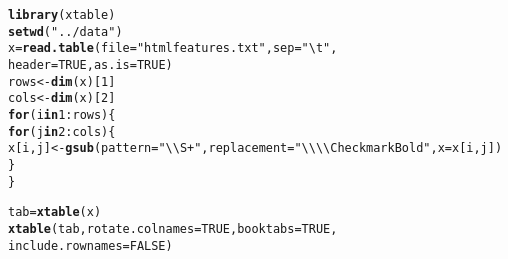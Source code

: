 \documentclass{article}\usepackage[]{graphicx}\usepackage[]{color}
\makeatletter
\newcommand{\hlnum}[1]{\textcolor[rgb]{0.686,0.059,0.569}{#1}}%
\newcommand{\hlstr}[1]{\textcolor[rgb]{0.192,0.494,0.8}{#1}}%
\newcommand{\hlopt}[1]{\textcolor[rgb]{0,0,0}{#1}}%
\newcommand{\hlstd}[1]{\textcolor[rgb]{0.345,0.345,0.345}{#1}}%
\newcommand{\hlkwa}[1]{\textcolor[rgb]{0.161,0.373,0.58}{\textbf{#1}}}%
\newcommand{\hlkwb}[1]{\textcolor[rgb]{0.69,0.353,0.396}{#1}}%
\newcommand{\hlkwc}[1]{\textcolor[rgb]{0.333,0.667,0.333}{#1}}%
\newcommand{\hlkwd}[1]{\textcolor[rgb]{0.737,0.353,0.396}{\textbf{#1}}}%
\newenvironment{kframe}{%
 \def\at@end@of@kframe{}%
 \ifinner\ifhmode%
  \def\at@end@of@kframe{\end{minipage}}%
  \begin{minipage}{\columnwidth}%
 \fi\fi%
 \def\FrameCommand##1{\hskip\@totalleftmargin \hskip-\fboxsep
 \colorbox{shadecolor}{##1}\hskip-\fboxsep
     \hskip-\linewidth \hskip-\@totalleftmargin \hskip\columnwidth}%
 \MakeFramed {\advance\hsize-\width
   \@totalleftmargin\z@ \linewidth\hsize
   \@setminipage}}%
 {\par\unskip\endMakeFramed%
 \at@end@of@kframe}
\makeatother
\begin{document}
\begin{kframe}
\begin{alltt}
\hlkwd{library}\hlstd{(xtable)}
\hlkwd{setwd}\hlstd{(}\hlstr{"../data"}\hlstd{)}
\hlstd{x} \hlkwb{=} \hlkwd{read.table}\hlstd{(}\hlkwc{file} \hlstd{=} \hlstr{"htmlfeatures.txt"}\hlstd{,} \hlkwc{sep} \hlstd{=} \hlstr{"\textbackslash{}t"}\hlstd{,}
                  \hlkwc{header} \hlstd{=} \hlnum{TRUE}\hlstd{,} \hlkwc{as.is} \hlstd{=} \hlnum{TRUE}\hlstd{)}
\hlstd{rows} \hlkwb{<-} \hlkwd{dim}\hlstd{(x)[}\hlnum{1}\hlstd{]}
\hlstd{cols} \hlkwb{<-} \hlkwd{dim}\hlstd{(x)[}\hlnum{2}\hlstd{]}
\hlkwa{for} \hlstd{(i} \hlkwa{in} \hlnum{1}\hlopt{:}\hlstd{rows)\{}
  \hlkwa{for} \hlstd{(j} \hlkwa{in} \hlnum{2}\hlopt{:}\hlstd{cols)\{}
    \hlstd{x[i, j]} \hlkwb{<-} \hlkwd{gsub}\hlstd{(}\hlkwc{pattern} \hlstd{=} \hlstr{"\textbackslash{}\textbackslash{}S+"}\hlstd{,}\hlkwc{replacement}\hlstd{=}\hlstr{"\textbackslash{}\textbackslash{}\textbackslash{}\textbackslash{}CheckmarkBold"}\hlstd{,} \hlkwc{x}\hlstd{=x[i,j])}
  \hlstd{\}}
\hlstd{\}}


\hlstd{tab} \hlkwb{=} \hlkwd{xtable}\hlstd{(x)}
\hlkwd{xtable}\hlstd{(tab,} \hlkwc{rotate.colnames} \hlstd{=} \hlnum{TRUE}\hlstd{,} \hlkwc{booktabs} \hlstd{=} \hlnum{TRUE}\hlstd{,}
             \hlkwc{include.rownames} \hlstd{=} \hlnum{FALSE}\hlstd{)}
\end{alltt}
\end{kframe}%
\end{document}
